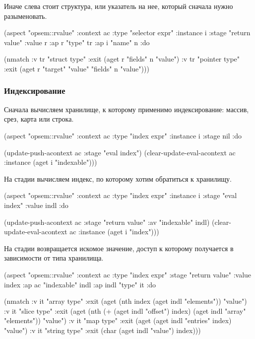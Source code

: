 \documentclass[12pt,twoside,russian]{article}
\newcommand{\textABMLString}[1]{{\color{abmlString}#1}}
\newcommand{\ABMLString}[1]{\abmlinline{\textABMLString{#1}}}
\begin{document}
Иначе слева стоит структура, или указатель на нее, который сначала нужно разыменовать.

\begin{ABMLCode}
(aspect "opsem::rvalue" :context ac :type "selector expr" :instance i 
  :stage "return value" :value r :ap r "type" tr :ap i "name" n :do 
  
  (nmatch 
  :v tr "struct type"  :exit (aget r "fields" n "value") 
  :v tr "pointer type" :exit (aget r "target" "value" "fields" n "value")))
\end{ABMLCode}

\subsubsection{Индексирование}
Сначала вычисляем хранилище, к которому применимо индексирование: массив, срез, карта или строка.

\begin{ABMLCode}
(aspect "opsem::rvalue" :context ac :type "index expr" :instance i 
  :stage nil :do 
  
  (update-push-acontext ac :stage "eval index")
  (clear-update-eval-acontext ac :instance (aget i "indexable")))
\end{ABMLCode}

На стадии \ABMLString{eval index} вычисляем индекс, по которому хотим обратиться к хранилищу.

\begin{ABMLCode}
(aspect "opsem::rvalue" :context ac :type "index expr" :instance i 
  :stage "eval index" :value indl :do 
  
  (update-push-acontext ac :stage "return value" :av "indexable" indl)
  (clear-update-eval-acontext ac :instance (aget i "index")))
\end{ABMLCode}

На стадии \ABMLString{return value} возвращается искомое значение, доступ к которому получается в зависимости от типа хранилища.

\begin{ABMLCode}
(aspect "opsem::rvalue" :context ac :type "index expr" 
  :stage "return value" :value index :ap ac "indexable" indl 
  :ap indl "type" it :do 
  
  (nmatch 
  :v it "array type"  
  :exit (aget (nth index (aget indl "elements")) "value")
  :v it "slice type"  
  :exit (aget (nth (+ (aget indl "offset") index) 
                   (aget indl "array" "elements")) "value")
  :v it "map type"    
  :exit (aget (aget indl "entries" index) "value")
  :v it "string type" 
  :exit (char (aget indl "value") index)))
\end{ABMLCode}
\end{document}
